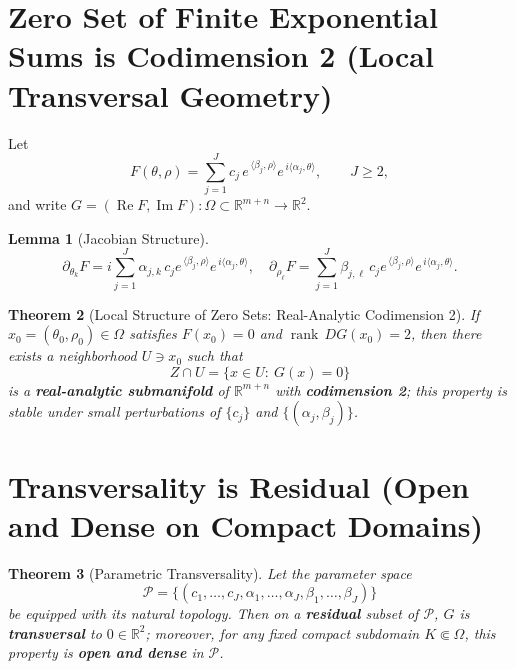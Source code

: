 \documentclass[11pt,a4paper]{article}
\newtheorem{theorem}{Theorem}[section]
\newtheorem{lemma}[theorem]{Lemma}
\theoremstyle{remark}
\DeclareMathOperator{\Re}{Re}
\DeclareMathOperator{\Im}{Im}
\DeclareMathOperator{\rank}{rank}
\begin{document}
\section{Zero Set of Finite Exponential Sums is Codimension 2 (Local Transversal Geometry)}

Let
\begin{equation}
F(\theta,\rho)=\sum_{j=1}^J c_j\,e^{\,\langle\beta_j,\rho\rangle}e^{\,i\langle\alpha_j,\theta\rangle},\qquad J\ge2,
\end{equation}
and write $G=(\Re F,\Im F):\Omega\subset\mathbb{R}^{m+n}\to\mathbb{R}^2$.

\begin{lemma}[Jacobian Structure]\label{lem:jacobian}
\begin{equation}
\partial_{\theta_k}F=i\sum_{j=1}^J \alpha_{j,k}\,c_j e^{\,\langle\beta_j,\rho\rangle}e^{\,i\langle\alpha_j,\theta\rangle},\quad
\partial_{\rho_\ell}F=\sum_{j=1}^J \beta_{j,\ell}\,c_j e^{\,\langle\beta_j,\rho\rangle}e^{\,i\langle\alpha_j,\theta\rangle}.
\end{equation}
\end{lemma}

\begin{theorem}[Local Structure of Zero Sets: Real-Analytic Codimension 2]\label{thm:codim2}
If $x_0=(\theta_0,\rho_0)\in\Omega$ satisfies $F(x_0)=0$ and $\rank\,DG(x_0)=2$, then there exists a neighborhood $U\ni x_0$ such that
\begin{equation}
Z\cap U=\{x\in U:\ G(x)=0\}
\end{equation}
is a \textbf{real-analytic submanifold} of $\mathbb{R}^{m+n}$ with \textbf{codimension 2}; this property is stable under small perturbations of $\{c_j\}$ and $\{(\alpha_j,\beta_j)\}$.
\end{theorem}

\section{Transversality is Residual (Open and Dense on Compact Domains)}

\begin{theorem}[Parametric Transversality]\label{thm:transversal}
Let the parameter space
\begin{equation}
\mathcal{P}=\Big\{(c_1,\ldots,c_J,\alpha_1,\ldots,\alpha_J,\beta_1,\ldots,\beta_J)\Big\}
\end{equation}
be equipped with its natural topology. Then on a \textbf{residual} subset of $\mathcal{P}$, $G$ is \textbf{transversal} to $0\in\mathbb{R}^2$; moreover, for any fixed compact subdomain $K\Subset\Omega$, this property is \textbf{open and dense} in $\mathcal{P}$.
\end{theorem}
\end{document}
